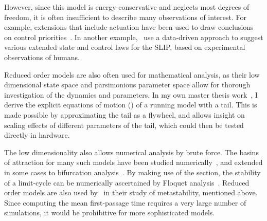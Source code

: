 However, since this model is energy-conservative and neglects most degrees of freedom, it is often insufficient to describe many observations of interest. For example, extensions that include actuation have been used to draw conclusions on control priorities~\cite{Birn-Jeffery3786,blum2014swing}. In another example,~\textcite{maus2015constructing} use a data-driven approach to suggest various extended state and control laws for the SLIP, based on experimental observations of humans. \par %
Reduced order models are also often used for mathematical analysis, as their low dimensional state space and parsimonious parameter space allow for thorough investigation of the dynamics and parameters.
In my own master thesis work~\cite{heim2016designing}, I derive the explicit equations of motion (\eom) of a running model with a tail. This is made possible by approximating the tail as a flywheel, and allows insight on scaling effects of different parameters of the tail, which could then be tested directly in hardware. \par
The low dimensionality also allows numerical analysis by brute force. The basins of attraction for many such models have been studied numerically~\cite{schwab2001basin,obayashi2016formation,cnops2015basin,rummel2008stable}, and extended in some cases to bifurcation analysis~\cite{aoi2006bifurcation,merker2015stable,gan2018all}. By making use of the \poincare section, the stability of a limit-cycle can be numerically ascertained by Floquet analysis~\cite{remy2011matlab}.
Reduced order models are also used by~\textcite{byl2009metastable} in their study of metastability, mentioned above. Since computing the mean first-passage time requires a very large number of simulations, it would be prohibitive for more sophisticated models. \par



